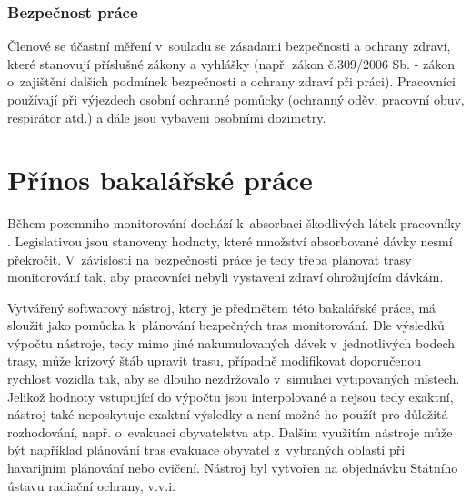 \subsubsection{Bezpečnost práce}

Členové  se účastní měření v~souladu se zásadami bezpečnosti a
ochrany zdraví, které stanovují příslušné zákony a vyhlášky
(např. zákon č.309/2006 Sb. - zákon o~zajištění dalších podmínek
bezpečnosti a ochrany zdraví při práci). Pracovníci používají při
výjezdech osobní ochranné pomůcky (ochranný oděv, pracovní obuv,
respirátor atd.) a dále jsou vybaveni osobními dozimetry.

\section{Přínos bakalářské práce} Během pozemního monitorování dochází
k~absorbaci škodlivých látek pracovníky . Legislativou jsou
stanoveny hodnoty, které množství absorbované dávky nesmí
překročit. V~závislosti na bezpečnosti práce je tedy třeba plánovat
trasy monitorování tak, aby pracovníci  nebyli vystaveni zdraví
ohrožujícím dávkám.

Vytvářený softwarový nástroj, který je předmětem této bakalářské
práce, má sloužit jako pomůcka k~plánování bezpečných tras
monitorování. Dle výsledků výpočtu nástroje, tedy mimo jiné
nakumulovaných dávek v~jednotlivých bodech trasy, může krizový štáb
upravit trasu, případně modifikovat doporučenou rychlost vozidla tak,
aby se dlouho nezdržovalo v~simulaci vytipovaných 
místech. Jelikož hodnoty vstupující do výpočtu jsou interpolované a
nejsou tedy exaktní, nástroj také neposkytuje exaktní výsledky a není
možné ho použít pro důležitá rozhodování, např. o~evakuaci
obyvatelstva atp. Dalším využitím nástroje může být například
plánování tras evakuace obyvatel z~vybraných oblastí při havarijním
plánování nebo cvičení. Nástroj byl vytvořen na objednávku Státního
ústavu radiační ochrany, v.v.i.
